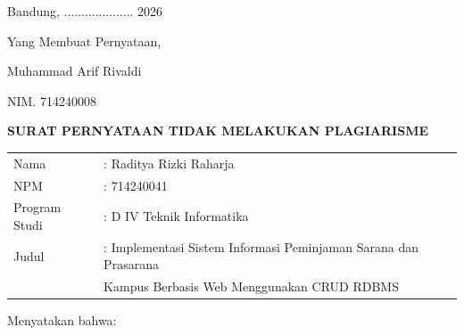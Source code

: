 \vspace{1cm}

\hfill Bandung, .................... 2026

\vspace{0.5cm}

\hfill Yang Membuat Pernyataan,

\vspace{1cm}

\hfill \underline{\hspace{5cm}}

\hfill Muhammad Arif Rivaldi

\hfill NIM. 714240008


\clearpage

\begin{center}
    {\fontsize{14}{16}\selectfont\bfseries SURAT PERNYATAAN TIDAK MELAKUKAN PLAGIARISME}
\end{center}

\vspace{1cm}

\begin{tabular}{@{}ll@{}}
    Nama & : Raditya Rizki Raharja \\
    NPM & : 714240041 \\
    Program Studi & : D IV Teknik Informatika \\
    Judul & : Implementasi Sistem Informasi Peminjaman Sarana dan Prasarana \\
    & \hspace{2mm} Kampus Berbasis Web Menggunakan CRUD RDBMS \\
\end{tabular}

\vspace{0.5cm}

\noindent
Menyatakan bahwa:


